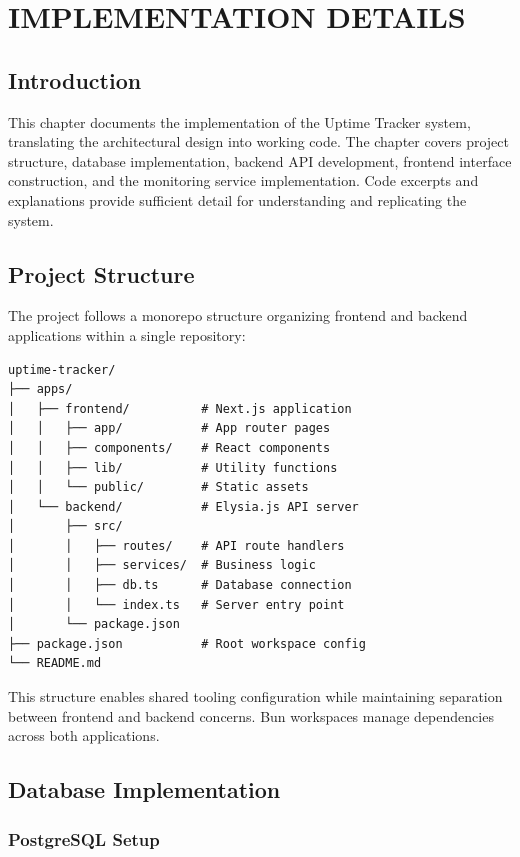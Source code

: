 \chapter{IMPLEMENTATION DETAILS}

\section{Introduction}

This chapter documents the implementation of the Uptime Tracker system, translating the architectural design into working code. The chapter covers project structure, database implementation, backend API development, frontend interface construction, and the monitoring service implementation. Code excerpts and explanations provide sufficient detail for understanding and replicating the system.

\section{Project Structure}

The project follows a monorepo structure organizing frontend and backend applications within a single repository:

\begin{verbatim}
uptime-tracker/
├── apps/
│   ├── frontend/          # Next.js application
│   │   ├── app/           # App router pages
│   │   ├── components/    # React components
│   │   ├── lib/           # Utility functions
│   │   └── public/        # Static assets
│   └── backend/           # Elysia.js API server
│       ├── src/
│       │   ├── routes/    # API route handlers
│       │   ├── services/  # Business logic
│       │   ├── db.ts      # Database connection
│       │   └── index.ts   # Server entry point
│       └── package.json
├── package.json           # Root workspace config
└── README.md
\end{verbatim}

This structure enables shared tooling configuration while maintaining separation between frontend and backend concerns. Bun workspaces manage dependencies across both applications.

\section{Database Implementation}

\subsection{PostgreSQL Setup}

